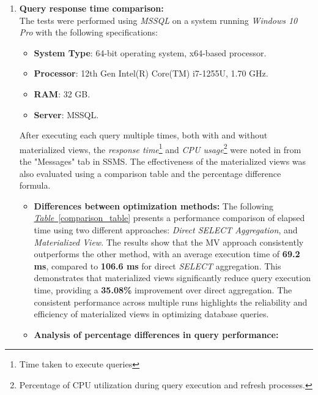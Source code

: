 \begin{enumerate}


    \item \textbf{ Query response time comparison:}\\
The tests were performed using \textit{MSSQL} on a system running \textit{Windows 10 Pro} with the following specifications:
\begin{itemize}
    \item \textbf{System Type}: 64-bit operating system, x64-based processor.
    \item \textbf{Processor}: 12th Gen Intel(R) Core(TM) i7-1255U, 1.70 GHz.
    \item \textbf{RAM}: 32 GB.
    \item \textbf{Server}: MSSQL.
\end{itemize}\vspace{.4cm}

After executing each query multiple times, both with and without materialized views, the \textit{response time}\footnote{Time taken to execute queries} and \textit{CPU usage}\footnote{Percentage of CPU utilization during query execution and refresh processes.} were noted in from the "Messages" tab in SSMS. The effectiveness of the materialized views was also evaluated using a comparison table and the percentage difference formula.

\begin{itemize}
\item\textbf{Differences between optimization methods:} The following \hyperref[comparison_table]{\textit{Table}~\ref*{comparison_table}} presents a performance comparison of elapsed time using two different approaches: \textit{Direct SELECT Aggregation}, and \textit{Materialized View}. The results show that the MV approach consistently outperforms the other method, with an average execution time of \textbf{69.2 ms}, compared to \textbf{106.6 ms} for direct \textit{SELECT} aggregation. This demonstrates that materialized views significantly reduce query execution time, providing a \textbf{35.08\%} improvement over direct aggregation. The consistent performance across multiple runs highlights the reliability and efficiency of materialized views in optimizing database queries.\vspace{.4cm}
 
 \vspace{.4cm
 }

 \item\textbf{Analysis of percentage differences in query performance:}
 

\end{itemize}
\end{enumerate}
